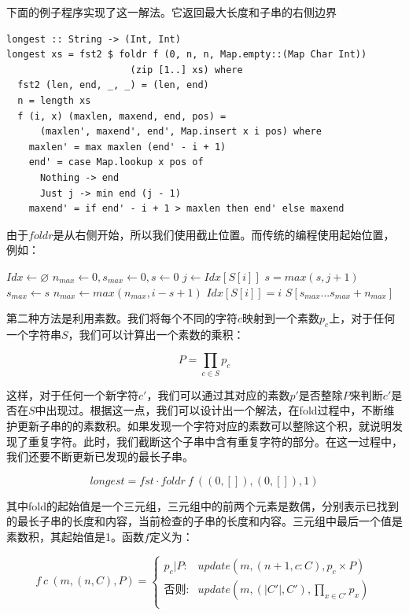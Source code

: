 \documentclass[UTF8]{article}
\begin{document}
\begin{enumerate}
下面的例子程序实现了这一解法。它返回最大长度和子串的右侧边界

\lstset{frame=single}
\begin{lstlisting}
longest :: String -> (Int, Int)
longest xs = fst2 $ foldr f (0, n, n, Map.empty::(Map Char Int))
                      (zip [1..] xs) where
  fst2 (len, end, _, _) = (len, end)
  n = length xs
  f (i, x) (maxlen, maxend, end, pos) =
      (maxlen', maxend', end', Map.insert x i pos) where
    maxlen' = max maxlen (end' - i + 1)
    end' = case Map.lookup x pos of
      Nothing -> end
      Just j -> min end (j - 1)
    maxend' = if end' - i + 1 > maxlen then end' else maxend
\end{lstlisting}

由于$foldr$是从右侧开始，所以我们使用截止位置。而传统的编程使用起始位置，例如：

\begin{algorithmic}
  \State $Idx \gets \varnothing$
  \State $n_{max} \gets 0, s_{max} \gets 0, s \gets 0$
      \State $j \gets Idx[S[i]]$
      \State $s = max(s, j + 1)$
    \EndIf
      \State $s_{max} \gets s$
    \EndIf
    \State $n_{max} \gets max(n_{max}, i - s + 1)$
    \State $Idx[S[i]] = i$
  \EndFor
  \State \Return $S[s_{max} ... s_{max} + n_{max}]$
\EndFunction
\end{algorithmic}

第二种方法是利用素数。我们将每个不同的字符$c$映射到一个素数$p_c$上，对于任何一个字符串$S$，我们可以计算出一个素数的乘积：

\[
P = \displaystyle \prod_{c \in S} p_c
\]

这样，对于任何一个新字符$c'$，我们可以通过其对应的素数$p'$是否整除$P$来判断$c'$是否在$S$中出现过。根据这一点，我们可以设计出一个解法，在fold过程中，不断维护更新子串的的素数积。如果发现一个字符对应的素数可以整除这个积，就说明发现了重复字符。此时，我们截断这个子串中含有重复字符的部分。在这一过程中，我们还要不断更新已发现的最长子串。

\[
longest = fst \cdot foldr\ f\ ((0, []), (0, []), 1)
\]

其中fold的起始值是一个三元组，三元组中的前两个元素是数偶，分别表示已找到的最长子串的长度和内容，当前检查的子串的长度和内容。三元组中最后一个值是素数积，其起始值是1。函数$f$定义为：

\[
f\ c\ (m, (n, C), P) = \begin{cases}
  p_c | P : & update(m, (n + 1, c : C), p_c \times P) \\
  \text{否则}: & update(m, (|C'|, C'), \displaystyle \prod_{x \in C'} p_x) \\
\end{cases}
\]


\end{enumerate}
\end{document}
